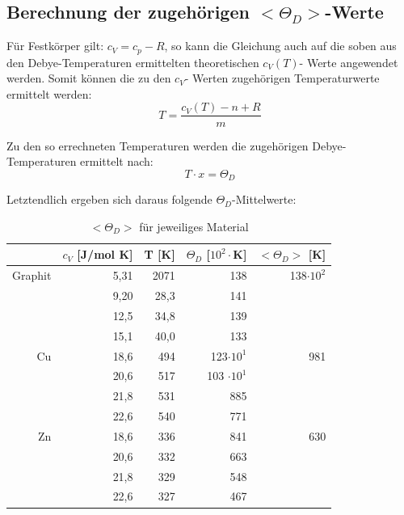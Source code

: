 \documentclass[12pt,a4paper,titlepage,headinclude,bibtotoc]{scrartcl}
\begin{document}
\FloatBarrier

\subsection{Berechnung der zugehörigen $<\Theta_D>$-Werte }


Für Festkörper gilt: $c_V =c_p -R$, so kann die Gleichung auch auf die soben aus den Debye-Temperaturen ermittelten theoretischen $c_V(T)$- Werte angewendet werden. Somit können die zu den $c_V$- Werten zugehörigen Temperaturwerte ermittelt werden:\\

\begin{equation}
T= \frac{c_V(T) -n +R}{m}
\end{equation}

Zu den so errechneten Temperaturen werden die zugehörigen Debye-Temperaturen ermittelt nach:\\

\begin{equation}
T \cdot x = \Theta_D
\end{equation}

Letztendlich ergeben sich daraus folgende $\Theta_D$-Mittelwerte:\\


\begin{table} [h]\caption{$<\Theta_D>$ für jeweiliges Material}
\begin{tabular} {r | r|  r |r |r}
& $c_V$ [J/mol K] & T	[K] &$\Theta_D$ [$10^2\cdot$K]	&$<\Theta_D>$ [K]\\
\hline
Graphit &5,31	&2071	&138&	138$\cdot10^2$\\
        &9,20	&28,3&	141\\	
        &12,5&	34,8&	139\\	
        &15,1	&40,0	&133\\
\hline						
Cu &18,6 &	494 &	123$\cdot 10^1$ &	981\\
&20,6 &	517&	103 $\cdot 10^1$&\\
&21,8&	531 &	885& \\
&22,6 &	540 &	771&\\	
\hline			
Zn &18,6 &	336 &	841 &	630  \\
&20,6 &	332 &	663&  \\	
&21,8 &	329 &	548& \\	
&22,6 &	327& 	467& \\

\end{tabular}
\end{table}
\end{document}
